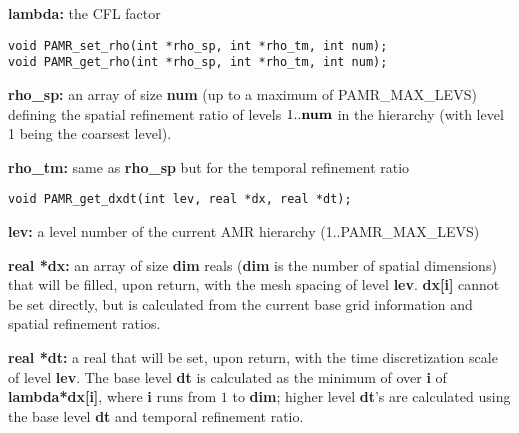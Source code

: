 \documentclass[aps,amssymb,unsortedaddress,nofootinbib]{revtex4}
\def\lsep{\itemsep 0.05in}
\begin{document}
\begin{list}{}{\lsep}
\item {\bf lambda:} the CFL factor 
\end{list}


\begin{verbatim}
void PAMR_set_rho(int *rho_sp, int *rho_tm, int num);
void PAMR_get_rho(int *rho_sp, int *rho_tm, int num);
\end{verbatim}

\begin{list}{}{\lsep}
\item {\bf *rho\_sp:} an array of size {\bf num} (up to a maximum of PAMR\_MAX\_LEVS) defining the spatial refinement 
                      ratio of levels $1..{\bf num}$ in the hierarchy (with level 1 being the coarsest level). 
\item {\bf *rho\_tm:} same as {\bf rho\_sp} but for the temporal refinement ratio
\end{list}


\begin{verbatim}
void PAMR_get_dxdt(int lev, real *dx, real *dt);
\end{verbatim}

\begin{list}{}{\lsep}
\item {\bf lev:} a level number of the current AMR hierarchy (1..PAMR\_MAX\_LEVS)
\item {\bf real *dx:} an array of size {\bf dim} reals ({\bf dim} is the number of
                      spatial dimensions) that will be filled, upon return, with the mesh spacing of level {\bf lev}.
                      {\bf dx[i]} cannot be set directly, but is calculated from the current
                      base grid information and spatial refinement ratios.
\item {\bf real *dt:} a real that will be set, upon return, with the time discretization scale 
                      of level {\bf lev}. The base level {\bf dt} is calculated as the minimum of 
                      over {\bf i} of {\bf lambda*dx[i]}, where {\bf i} runs from $1$ to {\bf dim};
                      higher level {\bf dt}'s are calculated using the base level {\bf dt} 
                      and temporal refinement ratio.

\end{list}
\end{document}
